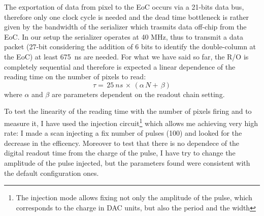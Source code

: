         The exportation of data from pixel to the EoC occurs via a 21-bits data bus, therefore only one clock cycle is needed and the dead time bottleneck is rather given by the bandwidth of the serializer which trasmits data off-chip from the EoC. In our setup the serializer operates at 40 MHz, thus to transmit a data packet (27-bit considering the addition of 6 bits to identify the double-column at the EoC) at least \SI{675}{ns} are needed. 
        For what we have said so far, the R/O is completely sequential and therefore is expected a linear dependence of the reading time on the number of pixels to read:
        \begin{equation}
            \tau =\, 25\: \unit{ns}\, \times\, (\alpha\, N +\, \beta)
            \label{eq:reading_time}
        \end{equation}
        where $\alpha$ and $\beta$ are parameters dependent on the readout chain setting. 
        
        To test the linearity of the reading time with the number of pixels firing and to measure it, I have used the injection circuit\footnote{The injection mode allows fixing not only the amplitude of the pulse, which corresponds to the charge in DAC units, but also the period and the width} which allows me achieving very high rate: I made a scan injecting a fix number of pulses (100) and looked for the decrease in the efficency. 
        Moreover to test that there is no dependece of the digital readout time from the charge of the pulse, I have try to change the amplitude of the pulse injected, but the parameters found were consistent with the default configuration ones.

